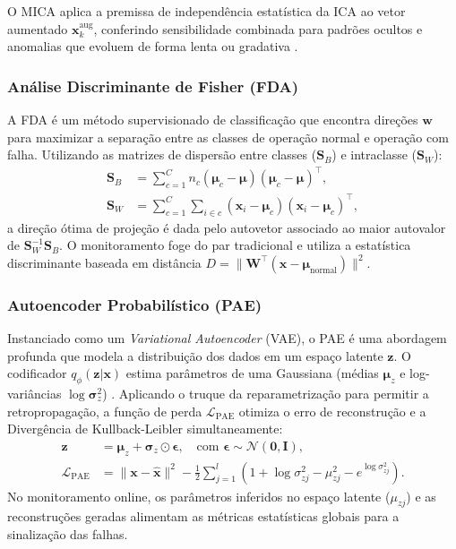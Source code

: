 \documentclass[journal]{IEEEtran}
\begin{document}
O MICA aplica a premissa de independência estatística da ICA ao vetor aumentado $\mathbf{x}^{\text{aug}}_k$, conferindo sensibilidade combinada para padrões ocultos e anomalias que evoluem de forma lenta ou gradativa \cite{yin2012}.

\subsubsection{Análise Discriminante de Fisher (FDA)}

A FDA é um método supervisionado de classificação que encontra direções $\mathbf{w}$ para maximizar a separação entre as classes de operação normal e operação com falha. Utilizando as matrizes de dispersão entre classes ($\mathbf{S}_B$) e intraclasse ($\mathbf{S}_W$):
\begin{align}
\mathbf{S}_B &= \sum_{c=1}^{C} n_c (\boldsymbol{\mu}_c - \boldsymbol{\mu})(\boldsymbol{\mu}_c - \boldsymbol{\mu})^\top, \label{eq:s_b}\\
\mathbf{S}_W &= \sum_{c=1}^{C} \sum_{i \in c} (\mathbf{x}_i - \boldsymbol{\mu}_c)(\mathbf{x}_i - \boldsymbol{\mu}_c)^\top, \label{eq:s_w}
\end{align}
a direção ótima de projeção é dada pelo autovetor associado ao maior autovalor de $\mathbf{S}_W^{-1}\mathbf{S}_B$. O monitoramento foge do par tradicional e utiliza a estatística discriminante baseada em distância $D = \|\mathbf{W}^\top (\mathbf{x} - \boldsymbol{\mu}_{\text{normal}})\|^2$.

\subsubsection{Autoencoder Probabilístico (PAE)}

Instanciado como um \textit{Variational Autoencoder} (VAE), o PAE é uma abordagem profunda que modela a distribuição dos dados em um espaço latente $\mathbf{z}$. O codificador $q_\phi(\mathbf{z}|\mathbf{x})$ estima parâmetros de uma Gaussiana (médias $\boldsymbol{\mu}_z$ e log-variâncias $\log \boldsymbol{\sigma}_z^2$) \cite{spina2024,geron2019}. Aplicando o truque da reparametrização para permitir a retropropagação, a função de perda $\mathcal{L}_{\text{PAE}}$ otimiza o erro de reconstrução e a Divergência de Kullback-Leibler simultaneamente:
\begin{align}
\mathbf{z} &= \boldsymbol{\mu}_z + \boldsymbol{\sigma}_z \odot \boldsymbol{\epsilon}, \quad \text{com } \boldsymbol{\epsilon} \sim \mathcal{N}(\mathbf{0}, \mathbf{I}), \label{eq:pae_reparam}\\
\mathcal{L}_{\text{PAE}} &= \|\mathbf{x} - \hat{\mathbf{x}}\|^2 - \frac{1}{2} \sum_{j=1}^{l} \left( 1 + \log\sigma_{zj}^2 - \mu_{zj}^2 - e^{\log\sigma_{zj}^2} \right). \label{eq:pae_loss}
\end{align}
No monitoramento online, os parâmetros inferidos no espaço latente ($\mu_{zj}$) e as reconstruções geradas alimentam as métricas estatísticas globais para a sinalização das falhas.
\end{document}
